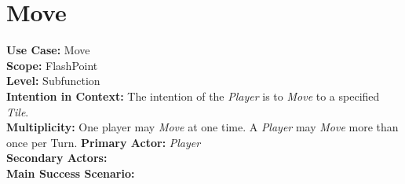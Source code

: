 \documentclass{article}
\begin{document}
	\section*{Move}
	\textbf{Use Case:} Move\\
	\textbf{Scope:} FlashPoint\\
	\textbf{Level:} Subfunction\\
	\textbf{Intention in Context: } The intention of the \textit{Player} is to \textit{Move} to a specified \textit{Tile}.\\
	\textbf{Multiplicity: } One player may \textit{Move} at one time. A \textit{Player} may \textit{Move} more than once per Turn.
	\textbf{Primary Actor:} \textit{Player} \\
	\textbf{Secondary Actors:} \\
	\textbf{Main Success Scenario:}\\
	
\end{document}
